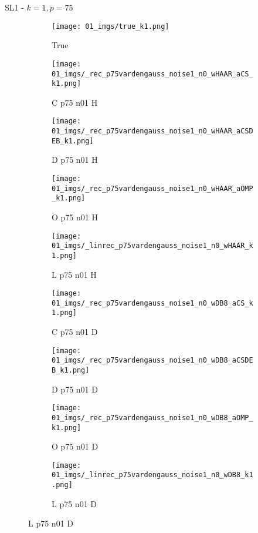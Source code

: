 \begin{frame}{SL1 - $k=1,p=75$}{}
\begin{figure}
\begin{subfigure}{0.1\textwidth}
\texttt{[image: 01\_imgs/true\_k1.png]}
\caption*{\Tiny True}
\end{subfigure}
\begin{subfigure}{0.1\textwidth}
\texttt{[image: 01\_imgs/\_rec\_p75vardengauss\_noise1\_n0\_wHAAR\_aCS\_k1.png]}
\caption*{\Tiny C p75 n01 H}
\end{subfigure}
\begin{subfigure}{0.1\textwidth}
\texttt{[image: 01\_imgs/\_rec\_p75vardengauss\_noise1\_n0\_wHAAR\_aCSDEB\_k1.png]}
\caption*{\Tiny D p75 n01 H}
\end{subfigure}
\begin{subfigure}{0.1\textwidth}
\texttt{[image: 01\_imgs/\_rec\_p75vardengauss\_noise1\_n0\_wHAAR\_aOMP\_k1.png]}
\caption*{\Tiny O p75 n01 H}
\end{subfigure}
\begin{subfigure}{0.1\textwidth}
\texttt{[image: 01\_imgs/\_linrec\_p75vardengauss\_noise1\_n0\_wHAAR\_k1.png]}
\caption*{\Tiny L p75 n01 H}
\end{subfigure}
\begin{subfigure}{0.1\textwidth}
\texttt{[image: 01\_imgs/\_rec\_p75vardengauss\_noise1\_n0\_wDB8\_aCS\_k1.png]}
\caption*{\Tiny C p75 n01 D}
\end{subfigure}
\begin{subfigure}{0.1\textwidth}
\texttt{[image: 01\_imgs/\_rec\_p75vardengauss\_noise1\_n0\_wDB8\_aCSDEB\_k1.png]}
\caption*{\Tiny D p75 n01 D}
\end{subfigure}
\begin{subfigure}{0.1\textwidth}
\texttt{[image: 01\_imgs/\_rec\_p75vardengauss\_noise1\_n0\_wDB8\_aOMP\_k1.png]}
\caption*{\Tiny O p75 n01 D}
\end{subfigure}
\begin{subfigure}{0.1\textwidth}
\texttt{[image: 01\_imgs/\_linrec\_p75vardengauss\_noise1\_n0\_wDB8\_k1.png]}
\caption*{\Tiny L p75 n01 D}
\end{subfigure}

\vspace{5pt}


\end{figure}
\end{frame}
